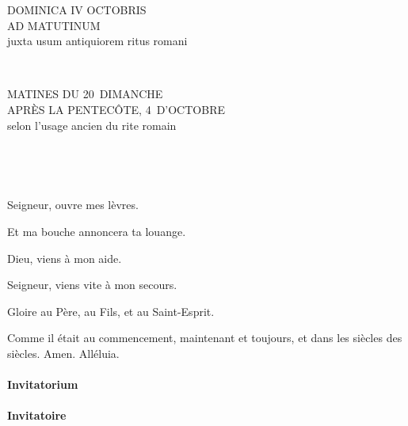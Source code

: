 \documentclass[twoside]{article}
\begin{document}
\null \newpage

\sloppy

\begin{paracol}[1]{2}

\begin{center}\begin{doublespace}

{
\MakeUppercase{\Large Dominica IV Octobris \\ ad Matutinum}\\
juxta usum antiquiorem ritus romani}
\end{doublespace}\end{center}


~~

\switchcolumn

\begin{center}\begin{doublespace}
{
\MakeUppercase{\Large Matines du 20\ieme~dimanche \\ après la Pentecôte, 4\ieme~d'octobre}\\
selon l'usage ancien du rite romain
}
\end{doublespace}\end{center}

~~

~~

\vv Seigneur, ouvre mes lèvres.

\rr Et ma bouche annoncera ta louange.

\vv Dieu, viens à mon aide.

\rr Seigneur, viens vite à mon secours.

\vv Gloire au Père, au Fils, et au Saint-Esprit.

\rr Comme il était au commencement, maintenant et toujours, et dans les siècles des siècles. Amen. Alléluia.

\switchcolumn*

\paragraph{Invitatorium}


\switchcolumn

\paragraph{Invitatoire}


\end{paracol}
\end{document}
